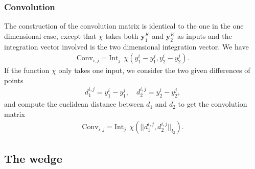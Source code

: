 \documentclass[11pt, a4paper]{article}
\theoremstyle{definition}
\begin{document}
\subsubsection{Convolution}
The construction of the convolution matrix is identical to the one in the one dimensional case, except that $\chi$ takes both $\mathbf{y}_1^{K}$ and $\mathbf{y}_2^{K}$ as inputs and the integration vector involved is the two dimensional integration vector.
We have
\begin{align*}
	\text{Conv}_{i,j} = \text{Int}_j \ \ \chi({y}_1^{i} - {y}_1^{j},{y}_2^{i} - {y}_2^{j}).
\end{align*}
If the function $\chi$ only takes one input, we  consider the two given differences of points 
\begin{align*}
	d_1^{i,j} = {y}_1^{i} - {y}_1^{j}, \quad
	d_2^{i,j} = {y}_2^{i} - {y}_2^{j},
\end{align*}
and compute the euclidean distance between $d_1$ and $d_2$ to get the convolution matrix
\begin{align*}
	\text{Conv}_{i,j} = \text{Int}_j \ \ \chi(||d_1^{i,j}, d_2^{i,j}||_{l_2}).
\end{align*}

\subsection{The wedge}
\end{document}
